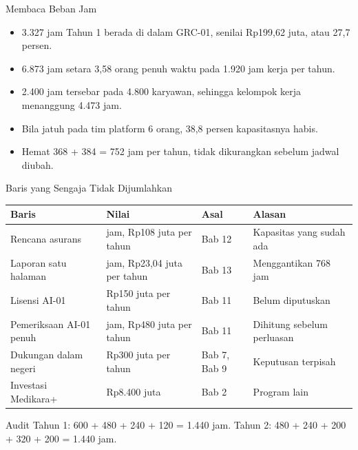 \documentclass[aspectratio=169, table, 12pt]{beamer}
\begin{document}
\begin{frame}{{\Large Membaca Beban Jam}}
  \vspace{6pt}
  \small
  \begin{itemize}
    \item 3.327 jam Tahun 1 berada di dalam GRC-01, senilai Rp199,62 juta, atau 27,7 persen.
    \item 6.873 jam setara 3,58 orang penuh waktu pada 1.920 jam kerja per tahun.
    \item 2.400 jam tersebar pada 4.800 karyawan, sehingga kelompok kerja menanggung 4.473 jam.
    \item Bila jatuh pada tim platform 6 orang, 38,8 persen kapasitasnya habis.
    \item Hemat 368 + 384 = 752 jam per tahun, tidak dikurangkan sebelum jadwal diubah.
  \end{itemize}
\end{frame}

\begin{frame}{{\Large Baris yang Sengaja Tidak Dijumlahkan}}
  \vspace{2pt}
  \scriptsize
  \begin{tabularx}{\textwidth}{|>{\raggedright\arraybackslash}p{}|>{\raggedright\arraybackslash}p{}|>{\raggedright\arraybackslash}p{}|>{\raggedright\arraybackslash}X|}
    \hline
    \textbf{Baris} & \textbf{Nilai} & \textbf{Asal} & \textbf{Alasan} \\ \hline
    Rencana asurans & 1.800 jam, Rp108 juta per tahun & Bab 12 & Kapasitas yang sudah ada \\ \hline
    Laporan satu halaman & 384 jam, Rp23,04 juta per tahun & Bab 13 & Menggantikan 768 jam \\ \hline
    Lisensi AI-01 & Rp150 juta per tahun & Bab 11 & Belum diputuskan \\ \hline
    Pemeriksaan AI-01 penuh & 8.000 jam, Rp480 juta per tahun & Bab 11 & Dihitung sebelum perluasan
    \\ \hline
    Dukungan dalam negeri & Rp300 juta per tahun & Bab 7, Bab 9 & Keputusan terpisah \\ \hline
    Investasi Medikara+ & Rp8.400 juta & Bab 2 & Program lain \\ \hline
  \end{tabularx}

  \vspace{6pt}
  \small Audit Tahun 1: 600 + 480 + 240 + 120 = 1.440 jam. Tahun 2: 480 + 240 + 200 + 320 + 200 =
  1.440 jam.
\end{frame}
\end{document}
